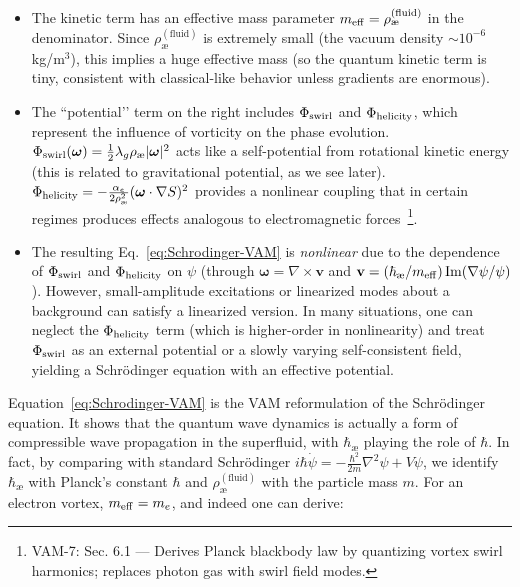 \documentclass[a4paper,12pt]{article}
\begin{document}
    \begin{itemize}
        \item The kinetic term has an effective mass parameter $m_{\rm eff} = \rho_{\text{\ae}}^{(\text{fluid})}$ in the denominator. Since $\rho_{\text{\ae}}^{(\text{fluid})}$ is extremely small (the vacuum density $\sim 10^{-6}$ kg/m$^3$), this implies a huge effective mass (so the quantum kinetic term is tiny, consistent with classical-like behavior unless gradients are enormous).
        \item The ``potential’’ term on the right includes $\Phi_{\rm swirl}$ and $\Phi_{\rm helicity}$, which represent the influence of vorticity on the phase evolution. $\Phi_{\rm swirl}(\boldsymbol{\omega}) = \frac{1}{2}\lambda_g \rho_{\text{\ae}} |\boldsymbol{\omega}|^2$ acts like a self-potential from rotational kinetic energy (this is related to gravitational potential, as we see later). $\Phi_{\rm helicity} = -\frac{\alpha_e}{2\rho_{\text{\ae}}^2}(\boldsymbol{\omega}\cdot \nabla S)^2$ provides a nonlinear coupling that in certain regimes produces effects analogous to electromagnetic forces~\footnote{VAM-7: Sec. 6.1 — Derives Planck blackbody law by quantizing vortex swirl harmonics; replaces photon gas with swirl field modes.}.
        \item The resulting Eq.~\eqref{eq:Schrodinger-VAM} is \emph{nonlinear} due to the dependence of $\Phi_{\rm swirl}$ and $\Phi_{\rm helicity}$ on $\psi$ (through $\boldsymbol{\omega} = \nabla \times \mathbf{v}$ and $\mathbf{v} = (\hbar_{\text{\ae}}/m_{\rm eff}) \Im(\nabla \psi/\psi)$). However, small-amplitude excitations or linearized modes about a background can satisfy a linearized version. In many situations, one can neglect the $\Phi_{\rm helicity}$ term (which is higher-order in nonlinearity) and treat $\Phi_{\rm swirl}$ as an external potential or a slowly varying self-consistent field, yielding a Schrödinger equation with an effective potential.
    \end{itemize}
    Equation~\eqref{eq:Schrodinger-VAM} is the VAM reformulation of the Schrödinger equation. It shows that the quantum wave dynamics is actually a form of compressible wave propagation in the superfluid, with $\hbar_{\text{\ae}}$ playing the role of $\hbar$. In fact, by comparing with standard Schrödinger $i\hbar \dot{\psi} = -\frac{\hbar^2}{2m}\nabla^2\psi + V \psi$, we identify $\hbar_{\text{\ae}}$ with Planck’s constant $\hbar$ and $\rho_{\text{\ae}}^{(\text{fluid})}$ with the particle mass $m$. For an electron vortex, $m_{\rm eff} = m_e$, and indeed one can derive:
\end{document}
